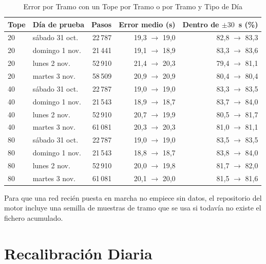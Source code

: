 \begin{table}[ht]
\centering
\caption{Error por Tramo con un Tope por Tramo o por Tramo y Tipo de Día}\label{tab:tope-tipo-dia}
\begin{tabular}{@{}llrrr@{}}
\toprule
Tope & Día de prueba & Pasos & Error medio (s) & Dentro de $\pm30$~s (\%)\\
\midrule
20 & sábado 31 oct. & 22\,787 & 19,3 $\to$ 19,0 & 82,8 $\to$ 83,3\\
20 & domingo 1 nov. & 21\,441 & 19,1 $\to$ 18,9 & 83,3 $\to$ 83,6\\
20 & lunes 2 nov. & 52\,910 & 21,4 $\to$ 20,3 & 79,4 $\to$ 81,1\\
20 & martes 3 nov. & 58\,509 & 20,9 $\to$ 20,9 & 80,4 $\to$ 80,4\\
40 & sábado 31 oct. & 22\,787 & 19,0 $\to$ 19,0 & 83,3 $\to$ 83,5\\
40 & domingo 1 nov. & 21\,543 & 18,9 $\to$ 18,7 & 83,7 $\to$ 84,0\\
40 & lunes 2 nov. & 52\,910 & 20,7 $\to$ 19,9 & 80,5 $\to$ 81,7\\
40 & martes 3 nov. & 61\,081 & 20,3 $\to$ 20,3 & 81,0 $\to$ 81,1\\
80 & sábado 31 oct. & 22\,787 & 19,0 $\to$ 19,0 & 83,5 $\to$ 83,5\\
80 & domingo 1 nov. & 21\,543 & 18,8 $\to$ 18,7 & 83,8 $\to$ 84,0\\
80 & lunes 2 nov. & 52\,910 & 20,0 $\to$ 19,8 & 81,7 $\to$ 82,0\\
80 & martes 3 nov. & 61\,081 & 20,1 $\to$ 20,0 & 81,5 $\to$ 81,6\\
\bottomrule
\end{tabular}

\end{table}

Para que una red recién puesta en marcha no empiece sin datos, el repositorio del motor incluye una semilla de muestras
de tramo que se usa si todavía no existe el fichero acumulado.

\section{Recalibración Diaria}
\label{sec:recalibracion}

